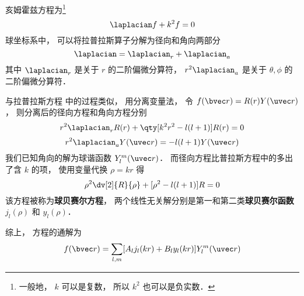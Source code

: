

亥姆霍兹方程为\footnote{一般地， $k$ 可以是复数， 所以 $k^2$ 也可以是负实数．}
\begin{equation}
\laplacian f + k^2 f = 0
\end{equation}
球坐标系中， 可以将拉普拉斯算子分解为径向和角向两部分
\begin{equation}
\laplacian = \laplacian_r + \laplacian_{a}
\end{equation}
其中 $\laplacian_r$ 是关于 $r$ 的二阶偏微分算符， $r^2\laplacian_{a}$ 是关于 $\theta, \phi$ 的二阶偏微分算符．

与拉普拉斯方程 中的过程类似， 用分离变量法， 令 $f(\bvec r) = R(r) Y(\uvec r)$， 则分离后的径向方程和角向方程分别
\begin{equation}
r^2\laplacian_r R(r) + \qty[k^2 r^2 - l(l+1)] R(r) = 0
\end{equation}
\begin{equation}
r^2 \laplacian_{a} Y(\uvec r) = -l(l+1) Y(\uvec r)
\end{equation}
我们已知角向的解为球谐函数 $Y_l^m(\uvec r)$． 而径向方程比普拉斯方程中的多出了含 $k$ 的项， 使用变量代换 $\rho = kr$ 得
\begin{equation}
\rho^2\dv[2]{R}{\rho} + [\rho^2 - l(l+1)] R = 0
\end{equation}
该方程被称为\textbf{球贝赛尔方程}， 两个线性无关解分别是第一和第二类\textbf{球贝赛尔函数} $j_l(\rho)$ 和 $y_l(\rho)$．

综上， 方程的通解为
\begin{equation}
f(\bvec r) = \sum_{l,m} [A_l j_l(kr) + B_l y_l(kr)] Y_l^m(\uvec r)
\end{equation}
